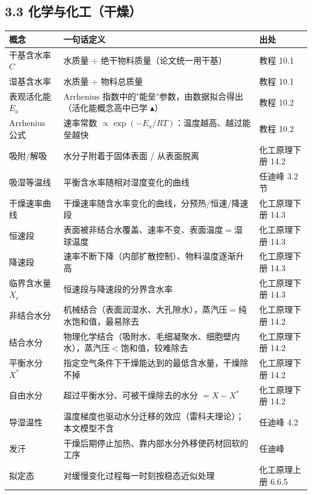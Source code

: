 \documentclass[12pt,a4paper]{ctexart}
\begin{document}
\subsection{3.3 化学与化工（干燥）}

\begin{center}
{\begin{tabular}{p{2.7cm}p{8.3cm}p{3.4cm}}
\toprule
概念 & 一句话定义 & 出处 \\
\midrule
干基含水率 $C$ & 水质量 $\div$ 绝干物料质量（论文统一用干基） & 教程 10.1 \\
湿基含水率 & 水质量 $\div$ 物料总质量 & 教程 10.1 \\
表观活化能 $E_a$ & Arrhenius 指数中的"能垒"参数，由数据拟合得出（活化能概念高中已学 $\blacktriangle$） & 教程 10.2 \\
Arrhenius 公式 & 速率常数 $\propto\exp(-E_a/RT)$：温度越高、越过能垒越快 & 教程 10.2 \\
吸附/解吸 & 水分子附着于固体表面 / 从表面脱离 & 化工原理下册 14.2 \\
吸湿等温线 & 平衡含水率随相对湿度变化的曲线 & 任迪峰 3.2 节 \\
干燥速率曲线 & 干燥速率随含水率变化的曲线，分预热/恒速/降速段 & 化工原理下册 14.3 \\
恒速段 & 表面被非结合水覆盖、速率不变、表面温度$=$湿球温度 & 化工原理下册 14.3 \\
降速段 & 速率不断下降（内部扩散控制）、物料温度逐渐升高 & 化工原理下册 14.3 \\
临界含水量 $X_c$ & 恒速段与降速段的分界含水率 & 化工原理下册 14.3 \\
非结合水分 & 机械结合（表面润湿水、大孔隙水），蒸汽压$=$纯水饱和值，最易除去 & 化工原理下册 14.2 \\
结合水分 & 物理化学结合（吸附水、毛细凝聚水、细胞壁内水），蒸汽压$<$饱和值，较难除去 & 化工原理下册 14.2 \\
平衡水分 $X^*$ & 指定空气条件下干燥能达到的最低含水量，干燥除不掉 & 化工原理下册 14.2 \\
自由水分 & 超过平衡水分、可被干燥除去的水分 $=X-X^*$ & 化工原理下册 14.2 \\
导湿温性 & 温度梯度也驱动水分迁移的效应（雷科夫理论）；本文模型不含 & 任迪峰 4.2 \\
发汗 & 干燥后期停止加热、靠内部水分外移使药材回软的工序 & 任迪峰 \\
拟定态 & 对缓慢变化过程每一时刻按稳态近似处理 & 化工原理上册 6.6.5 \\
\bottomrule
\end{tabular}}
\end{center}
\end{document}
